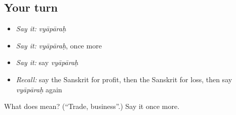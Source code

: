 \subsection*{Your turn}
\begin{itemize}
\raggedright
  \item \emph{Say it:} \emph{vyāpāraḥ}
  \item \emph{Say it:} \emph{vyāpāraḥ}, once more
  \item \emph{Say it:} say \emph{vyāpāraḥ}
  \item \emph{Recall:} say the Sanskrit for profit, then the Sanskrit for loss, then say \emph{vyāpāraḥ} again
\end{itemize}

\begin{tcolorbox}[breakable,colback=teal!4,colframe=teal!35!black,title={Before you move on}]
What does  mean? (\textquotedblleft{}Trade, business\textquotedblright{}.) Say it once more.
\end{tcolorbox}
